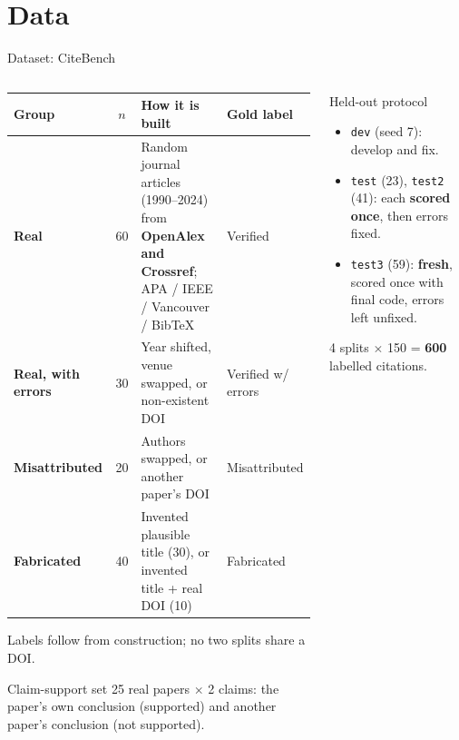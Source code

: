 \documentclass[aspectratio=169,10pt]{beamer}
\newcommand{\hl}[1]{\textcolor{accentblue}{\textbf{#1}}}
\begin{document}
\section{Data}

\begin{frame}{Dataset: CiteBench}
  \begin{columns}[T]
    \begin{column}{0.62\textwidth}
      \scriptsize
      \renewcommand{\arraystretch}{1.2}
      \begin{tabular}{>{\bfseries}l c P{3.7cm} l}
        \toprule
        Group & $n$ & How it is built & Gold label \\
        \midrule
        Real & 60 & Random journal articles (1990--2024) from \hl{OpenAlex and Crossref}; APA / IEEE / Vancouver / BibTeX & Verified \\
        Real, with errors & 30 & Year shifted, venue swapped, or non-existent DOI & Verified w/ errors \\
        Misattributed & 20 & Authors swapped, or another paper's DOI & Misattributed \\
        Fabricated & 40 & Invented plausible title (30), or invented title + real DOI (10) & Fabricated \\
        \bottomrule
      \end{tabular}
      \vspace{4pt}

      \small Labels follow from construction; no two splits share a DOI.
      \vspace{3pt}

      \begin{exampleblock}{Claim-support set}
        \scriptsize 25 real papers $\times$ 2 claims: the paper's own conclusion (supported) and
        another paper's conclusion (not supported).
      \end{exampleblock}
    \end{column}
    \begin{column}{0.36\textwidth}
      \begin{block}{Held-out protocol}
        \small
        \begin{itemize}
          \item \texttt{dev} (seed 7): develop and fix.
          \item \texttt{test} (23), \texttt{test2} (41): each \hl{scored once}, then errors fixed.
          \item \texttt{test3} (59): \hl{fresh}, scored once with final code, errors left unfixed.
        \end{itemize}
      \end{block}
      \small 4 splits $\times$ 150 = \hl{600} labelled citations.
    \end{column}
  \end{columns}
\end{frame}
\end{document}
